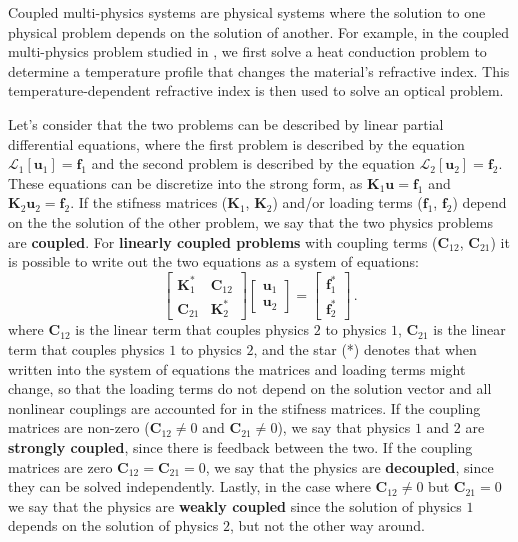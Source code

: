    Coupled multi-physics systems are physical systems where the solution to one physical 
    problem depends on the solution of another. For example, in the coupled multi-physics 
    problem studied in \cite{ownpub0}, we first solve a heat conduction problem to determine
    a temperature profile that changes the material's refractive index. This temperature-dependent
     refractive index is then used to solve an optical problem. 
     
     Let's consider
    that the two
    problems can be described by linear partial differential equations, where the
    first problem
    is described by the equation $\mathcal{L}_1 [\mathbf{u}_1]= \mathbf{f}_1$ and
    the second problem is described by the
    equation $\mathcal{L}_2 [\mathbf{u}_2]= \mathbf{f}_2$. These equations can be
    discretize into the strong form,
    as $\mathbf{K}_1 \mathbf{u} = \mathbf{f}_1$ and $\mathbf{K}_2 \mathbf{u}_2 =
\mathbf{f}_2$.
    If the stifness matrices ($\mathbf{K}_1$, $\mathbf{K}_2$) and/or loading terms ($\mathbf{f}_1$, $\mathbf{f}_2$) depend on the the solution of the
    other problem, we say that the two physics problems are
    \textbf{coupled}. For \textbf{linearly coupled problems} with coupling terms ($\mathbf{C}_{12}$, $\mathbf{C}_{21}$) it is possible to write out the two equations as a system of equations:
    \begin{equation}
        \begin{bmatrix}
            \mathbf{K}^*_1  & \mathbf{C}_{12} \\
            \mathbf{C}_{21} & \mathbf{K}^*_2
        \end{bmatrix}
        \begin{bmatrix}
            \mathbf{u}_1 \\
            \mathbf{u}_2
        \end{bmatrix}
        =
        \begin{bmatrix}
            \mathbf{f}_1^* \\
            \mathbf{f}_2^*
        \end{bmatrix}\,.
    \end{equation}
    where $\mathbf{C}_{12}$ is the linear term that couples physics $2$ to physics $1$,
$\mathbf{C}_{21}$ is the linear term that couples physics $1$ to physics $2$, and the
    star (*) denotes that when written into the system of equations
    the matrices and loading terms might change, so that the loading terms do not
    depend on the solution vector and all nonlinear couplings are
    accounted for in the stifness matrices. If the coupling
    matrices are non-zero ($\mathbf{C}_{12}\neq 0$ and $\mathbf{C}_{21}\neq 0$), we
    say that physics $1$ and $2$ are
    \textbf{strongly coupled}, since there is feedback between the two. If the
    coupling matrices are zero $\mathbf{C}_{12}=\mathbf{C}_{21}=0$, we say that the
    physics
    are \textbf{decoupled}, since they can be solved independently. Lastly, in the
    case where $\mathbf{C}_{12}\neq 0$ but $\mathbf{C}_{21} = 0$ we say that the
    physics are \textbf{weakly
        coupled} since the solution of physics $1$ depends on the solution of physics
$2$, but not the other way around.

